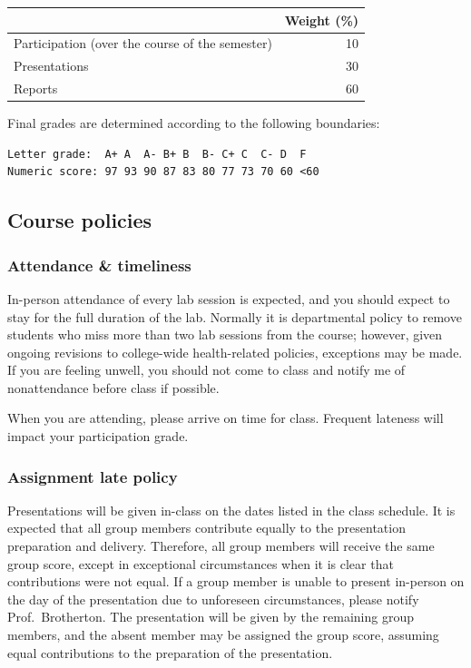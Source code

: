 \documentclass[
  letterpaper,
  DIV=11,
  numbers=noendperiod]{scrartcl}
\newcounter{none} %
\begin{document}
{\def\LTcaptype{none} %
\begin{longtable}[]{@{}lr@{}}
\toprule\noalign{}
& Weight (\%) \\
\midrule\noalign{}
\endhead
\bottomrule\noalign{}
\endlastfoot
Participation (over the course of the semester) & 10 \\
Presentations & 30 \\
Reports & 60 \\
\end{longtable}
}

Final grades are determined according to the following boundaries:

\begin{verbatim}
Letter grade:  A+ A  A- B+ B  B- C+ C  C- D  F
Numeric score: 97 93 90 87 83 80 77 73 70 60 <60
\end{verbatim}

\subsection{Course policies}\label{course-policies}

\subsubsection{Attendance \& timeliness}\label{attendance-timeliness}

In-person attendance of every lab session is expected, and you should
expect to stay for the full duration of the lab. Normally it is
departmental policy to remove students who miss more than two lab
sessions from the course; however, given ongoing revisions to
college-wide health-related policies, exceptions may be made. If you are
feeling unwell, you should not come to class and notify me of
nonattendance before class if possible.

When you are attending, please arrive on time for class. Frequent
lateness will impact your participation grade.

\subsubsection{Assignment late policy}\label{sec-late-policy}

Presentations will be given in-class on the dates listed in the class
schedule. It is expected that all group members contribute equally to
the presentation preparation and delivery. Therefore, all group members
will receive the same group score, except in exceptional circumstances
when it is clear that contributions were not equal. If a group member is
unable to present in-person on the day of the presentation due to
unforeseen circumstances, please notify Prof.~Brotherton. The
presentation will be given by the remaining group members, and the
absent member may be assigned the group score, assuming equal
contributions to the preparation of the presentation.
\end{document}
